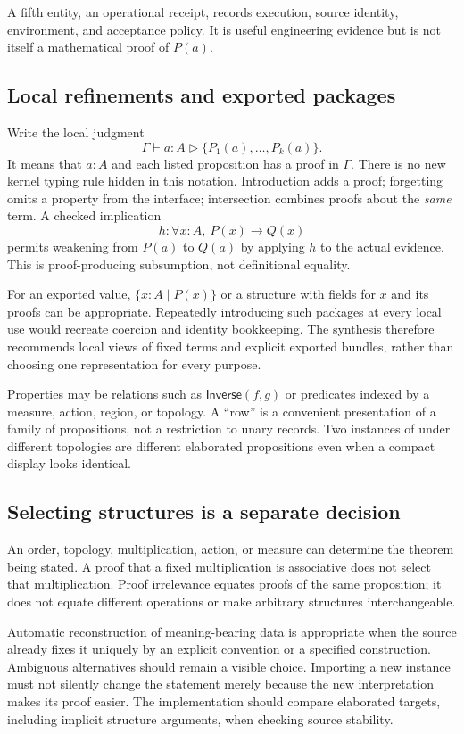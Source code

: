 \documentclass[11pt,letterpaper]{article}
\newcommand{\code}[1]{\texttt{\detokenize{#1}}}
\theoremstyle{definition}\newtheorem{definition}[proposition]{Definition}
\theoremstyle{remark}\newtheorem{remark}[proposition]{Remark}
\begin{document}
A fifth entity, an operational receipt, records execution, source identity,
environment, and acceptance policy. It is useful engineering evidence but is
not itself a mathematical proof of $P(a)$.

\subsection{Local refinements and exported packages}
Write the local judgment
\[
 \Gamma\vdash a:A\triangleright\{P_1(a),\ldots,P_k(a)\}.
\]
It means that $a:A$ and each listed proposition has a proof in $\Gamma$.
There is no new kernel typing rule hidden in this notation. Introduction adds
a proof; forgetting omits a property from the interface; intersection combines
proofs about the \emph{same} term. A checked implication
\[
 h:\forall x:A,\ P(x)\to Q(x)
\]
permits weakening from $P(a)$ to $Q(a)$ by applying $h$ to the actual evidence.
This is proof-producing subsumption, not definitional equality.

For an exported value, $\{x:A\mid P(x)\}$ or a structure with fields for $x$ and
its proofs can be appropriate. Repeatedly introducing such packages at every
local use would recreate coercion and identity bookkeeping. The synthesis
therefore recommends local views of fixed terms and explicit exported bundles,
rather than choosing one representation for every purpose.

Properties may be relations such as $\mathsf{Inverse}(f,g)$ or predicates
indexed by a measure, action, region, or topology. A ``row'' is a convenient
presentation of a family of propositions, not a restriction to unary records.
Two instances of \code{Continuous f} under different topologies are different
elaborated propositions even when a compact display looks identical.

\subsection{Selecting structures is a separate decision}
An order, topology, multiplication, action, or measure can determine the theorem
being stated. A proof that a fixed multiplication is associative does not select
that multiplication. Proof irrelevance equates proofs of the same proposition;
it does not equate different operations or make arbitrary structures
interchangeable.

Automatic reconstruction of meaning-bearing data is appropriate when the source
already fixes it uniquely by an explicit convention or a specified construction.
Ambiguous alternatives should remain a visible choice. Importing a new instance
must not silently change the statement merely because the new interpretation
makes its proof easier. The implementation should compare elaborated targets,
including implicit structure arguments, when checking source stability.
\end{document}
